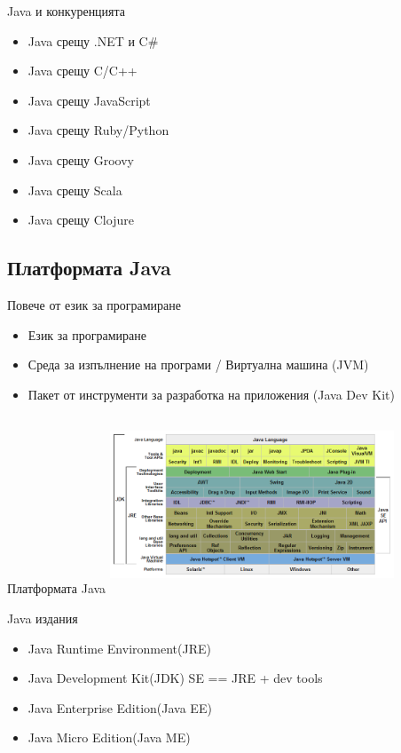 \documentclass{beamer}
\begin{document}
\begin{frame}{Java и конкуренцията}
  \transdissolve
  \begin{itemize}
    \item Java срещу .NET и C\# \pause
    \item Java срещу C/C++ \pause
    \item Java срещу JavaScript \pause
    \item Java срещу Ruby/Python \pause
    \item Java срещу Groovy \pause
    \item Java срещу Scala \pause
    \item Java срещу Clojure
  \end{itemize}
\end{frame}

\subsection{Платформата Java}

\begin{frame}{Повече от език за програмиране}
  \transdissolve
  \begin{itemize}
    \item Език за програмиране \pause
    \item Среда за изпълнение на програми / Виртуална машина (JVM) \pause
    \item Пакет от инструменти за разработка на приложения (Java Dev
      Kit) \pause
  \end{itemize}

\end{frame}

\begin{frame}{Платформата Java}
  \transdissolve
  \includegraphics[height=200px, width=320px]{images/JavaPlatform.png}
\end{frame}

\begin{frame}{Java издания}
  \transdissolve
  \begin{itemize}
    \item Java Runtime Environment(JRE) \pause
    \item Java Development Kit(JDK) SE == JRE + dev tools \pause
    \item Java Enterprise Edition(Java EE) \pause
    \item Java Micro Edition(Java ME) \pause
  \end{itemize}
\end{frame}
\end{document}
